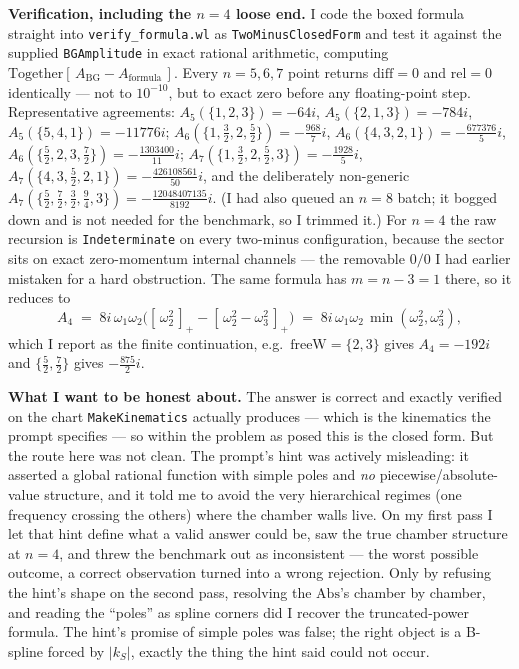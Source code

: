 \documentclass{article}
\newcommand{\pp}[1]{\left[\,#1\,\right]_{+}}
\begin{document}
\medskip
\noindent\textbf{Verification, including the $n=4$ loose end.}\quad
I code the boxed formula straight into \texttt{verify\_formula.wl} as
\texttt{TwoMinusClosedForm} and test it against the supplied \texttt{BGAmplitude}
in exact rational arithmetic, computing $\mathrm{Together}[\,A_{\mathrm{BG}}-
A_{\mathrm{formula}}\,]$. Every $n=5,6,7$ point returns
$\mathrm{diff}=0$ and $\mathrm{rel}=0$ identically --- not to $10^{-10}$, but to
exact zero before any floating-point step. Representative agreements:
$A_5(\{1,2,3\})=-64i$, $A_5(\{2,1,3\})=-784i$, $A_5(\{5,4,1\})=-11776i$;
$A_6(\{1,\tfrac32,2,\tfrac52\})=-\tfrac{968}{7}i$,
$A_6(\{4,3,2,1\})=-\tfrac{677376}{5}i$,
$A_6(\{\tfrac52,2,3,\tfrac72\})=-\tfrac{1303400}{11}i$;
$A_7(\{1,\tfrac32,2,\tfrac52,3\})=-\tfrac{1928}{5}i$,
$A_7(\{4,3,\tfrac52,2,1\})=-\tfrac{426108561}{50}i$, and the deliberately
non-generic $A_7(\{\tfrac52,\tfrac72,\tfrac32,\tfrac94,3\})
=-\tfrac{12048407135}{8192}i$. (I had also queued an $n=8$ batch; it bogged down
and is not needed for the benchmark, so I trimmed it.) For $n=4$ the raw
recursion is \texttt{Indeterminate} on every two-minus configuration, because the
sector sits on exact zero-momentum internal channels --- the removable $0/0$ I
had earlier mistaken for a hard obstruction. The same formula has $m=n-3=1$
there, so it reduces to
\[
A_4 \;=\; 8 i\,\omega_1\omega_2\big(\pp{\omega_2^2}-\pp{\omega_2^2-\omega_3^2}\big)
\;=\; 8 i\,\omega_1\omega_2\,\min(\omega_2^2,\omega_3^2),
\]
which I report as the finite continuation, e.g.\ $\mathrm{freeW}=\{2,3\}$ gives
$A_4=-192i$ and $\{\tfrac52,\tfrac72\}$ gives $-\tfrac{875}{2}i$.

\medskip
\noindent\textbf{What I want to be honest about.}\quad
The answer is correct and exactly verified on the chart \texttt{MakeKinematics}
actually produces --- which is the kinematics the prompt specifies --- so within
the problem as posed this is the closed form. But the route here was not clean.
The prompt's hint was actively misleading: it asserted a global rational function
with simple poles and \emph{no} piecewise/absolute-value structure, and it told
me to avoid the very hierarchical regimes (one frequency crossing the others)
where the chamber walls live. On my first pass I let that hint define what a
valid answer could be, saw the true chamber structure at $n=4$, and threw the
benchmark out as inconsistent --- the worst possible outcome, a correct
observation turned into a wrong rejection. Only by refusing the hint's shape on
the second pass, resolving the $\mathrm{Abs}$'s chamber by chamber, and reading
the ``poles'' as spline corners did I recover the truncated-power formula. The
hint's promise of simple poles was false; the right object is a B-spline forced by
$|k_S|$, exactly the thing the hint said could not occur.
\end{document}
